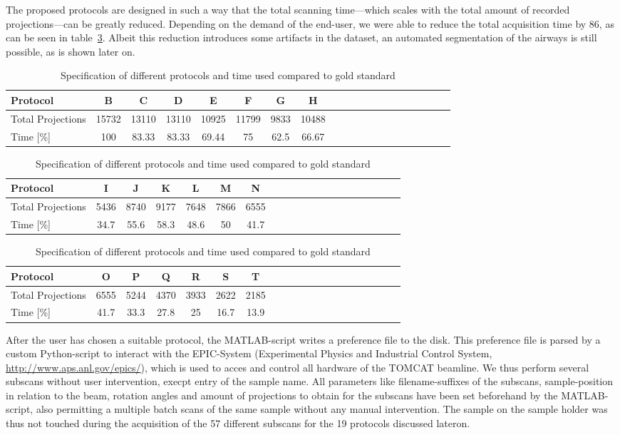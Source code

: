 The proposed protocols are designed in such a way that the total scanning time---which scales with the total amount of recorded projections---can be greatly reduced. Depending on the demand of the end-user, we were able to reduce the total acquisition time by 86\percent, as can be seen in table~\ref{tab:projections}. Albeit this reduction introduces some artifacts in the dataset, an automated segmentation of the airways is still possible, as is shown later on. 

\begin{table}
\centering
	\caption{Specification of different protocols and time used compared to gold standard}
	\begin{tabular*}{\textwidth}{l@{\extracolsep\fill}ccccccccccccccccccc}
		\toprule
		Protocol 			& B & C & D & E & F & G & H\\
		\midrule
		Total Projections 	& 15732 & 13110 & 13110 & 10925 & 11799 & 9833 & 10488\\
		Time [\%] 			& 100 & 83.33 & 83.33 & 69.44 & 75 & 62.5 & 66.67\\
	\end{tabular*}
	\begin{tabular*}{\textwidth}{l@{\extracolsep\fill}ccccccccccccccccccc}
		\toprule
		Protocol 			& I & J & K & L & M & N \\
		\midrule
		Total Projections 	& 5436 & 8740 & 9177 & 7648 & 7866 & 6555 \\
		Time [\%] 			& 34.7 & 55.6 & 58.3 & 48.6 & 50 & 41.7 \\
	\end{tabular*}
	\begin{tabular*}{\textwidth}{l@{\extracolsep\fill}ccccccccccccccccccc}
		\toprule
		Protocol 			& O & P & Q & R & S & T \\
		\midrule
		Total Projections 	& 6555 & 5244 & 4370 & 3933 & 2622 & 2185 \\
		Time [\%] 			& 41.7 & 33.3 & 27.8 & 25 & 16.7 & 13.9 \\
		\bottomrule
	\end{tabular*}
	\label{tab:projections}
\end{table}

After the user has chosen a suitable protocol, the MATLAB-script writes a preference file to the disk. This preference file is parsed by a custom Python-script to interact with the EPIC-System (Experimental Physics and Industrial Control System, \url{http://www.aps.anl.gov/epics/}), which is used to acces and control all hardware of the TOMCAT beamline. We thus perform several subscans without user intervention, execpt entry of the sample name. All parameters like filename-suffixes of the subscans, sample-position in relation to the beam, rotation angles and amount of projections to obtain for the subscans have been set beforehand by the MATLAB-script, also permitting a multiple batch scans of the same sample without any manual intervention. The sample on the sample holder was thus not touched during the acquisition of the 57 different subscans for the 19 protocols discussed lateron. 

